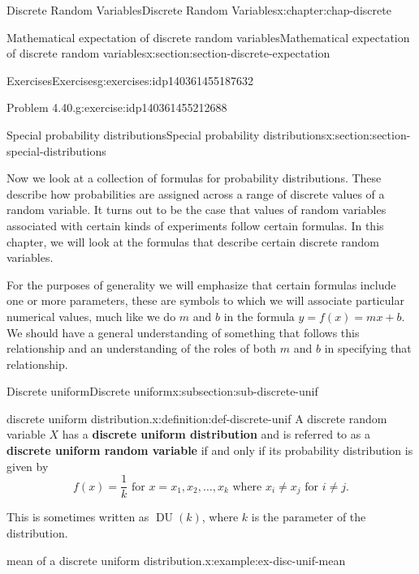 \documentclass[oneside,10pt,]{book}
\newcommand{\terminology}[1]{\textbf{#1}}
\numberwithin{equation}{section}
\begin{document}
\begin{chapterptx}{Discrete Random Variables}{}{Discrete Random Variables}{}{}{x:chapter:chap-discrete}
\begin{sectionptx}{Mathematical expectation of discrete random variables}{}{Mathematical expectation of discrete random variables}{}{}{x:section:section-discrete-expectation}
\begin{exercises-subsection}{Exercises}{}{Exercises}{}{}{g:exercises:idp140361455187632}
\begin{divisionexercise}{2}{Problem 4.40.}{}{g:exercise:idp140361455212688}
\end{divisionexercise}%
\end{exercises-subsection}
\end{sectionptx}
%
%
\typeout{************************************************}
\typeout{************************************************}
%
\begin{sectionptx}{Special probability distributions}{}{Special probability distributions}{}{}{x:section:section-special-distributions}
\begin{introduction}{}%
Now we look at a collection of formulas for probability distributions. These describe how probabilities are assigned across a range of discrete values of a random variable. It turns out to be the case that values of random variables associated with certain kinds of experiments follow certain formulas. In this chapter, we will look at the formulas that describe certain discrete random variables.%
\par
For the purposes of generality we will emphasize that certain formulas include one or more parameters, these are symbols to which we will associate particular numerical values, much like we do \(m\) and \(b\) in the formula \(y = f(x) = mx+b\). We should have a general understanding of something that follows this relationship and an understanding of the roles of both \(m\) and \(b\) in specifying that relationship.%
\end{introduction}%
%
%
\typeout{************************************************}
\typeout{************************************************}
%
\begin{subsectionptx}{Discrete uniform}{}{Discrete uniform}{}{}{x:subsection:sub-discrete-unif}
\begin{definition}{discrete uniform distribution.}{x:definition:def-discrete-unif}%
A discrete random variable \(\displaystyle X\) has a \terminology{discrete uniform distribution} and is referred to as a \terminology{discrete uniform random variable} if and only if its probability distribution is given by%
\begin{equation*}
f(x) = \frac{1}{k} \text{ for }
x = x_1, x_2, \dots, x_k \text{ where }x_i\ne x_j \text{ for } i \ne
j\text{.}
\end{equation*}
%
\end{definition}
This is sometimes written as \(\operatorname{DU}(k)\), where \(k\) is the parameter of the distribution.%
\begin{example}{mean of a discrete uniform distribution.}{x:example:ex-disc-unif-mean}%

\end{example}
\end{subsectionptx}
\end{sectionptx}
\end{chapterptx}
\end{document}
